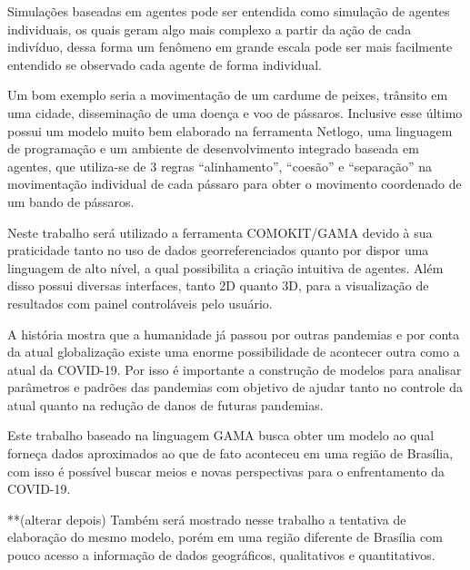 



Simulações baseadas em agentes pode ser entendida como simulação de agentes individuais, os quais geram algo mais complexo a partir da ação de cada indivíduo, dessa forma um fenômeno em grande escala pode ser mais facilmente entendido se observado cada agente de forma individual.

Um bom exemplo seria a movimentação de um cardume de peixes, trânsito em uma cidade, disseminação de uma doença e voo de pássaros. Inclusive esse último possui um modelo muito bem elaborado na ferramenta Netlogo, uma linguagem de programação e um ambiente de desenvolvimento integrado baseada em agentes, que utiliza-se de 3 regras “alinhamento”, “coesão” e “separação” na movimentação individual de cada pássaro para obter o movimento coordenado de um bando de pássaros.

Neste trabalho será utilizado a ferramenta COMOKIT/GAMA devido à sua praticidade tanto no uso de dados georreferenciados quanto por dispor uma linguagem de alto nível, a qual possibilita a criação intuitiva de agentes. Além disso possui diversas interfaces, tanto 2D quanto 3D, para a visualização de resultados com painel controláveis pelo usuário.

A história mostra que a humanidade já passou por outras pandemias e por conta da atual globalização existe uma enorme possibilidade de acontecer outra como a atual da COVID-19. Por isso é importante a construção de modelos para analisar parâmetros e padrões das pandemias com objetivo de ajudar tanto no controle da atual quanto na redução de danos de futuras pandemias. 

Este trabalho baseado na linguagem GAMA busca obter um modelo ao qual forneça dados aproximados ao que de fato aconteceu em uma região de Brasília, com isso é possível buscar meios e novas perspectivas para o enfrentamento da COVID-19.

**(alterar depois) Também será mostrado nesse trabalho a tentativa de elaboração do mesmo modelo, porém em uma região diferente de Brasília com pouco acesso a informação de dados geográficos, qualitativos e quantitativos.


